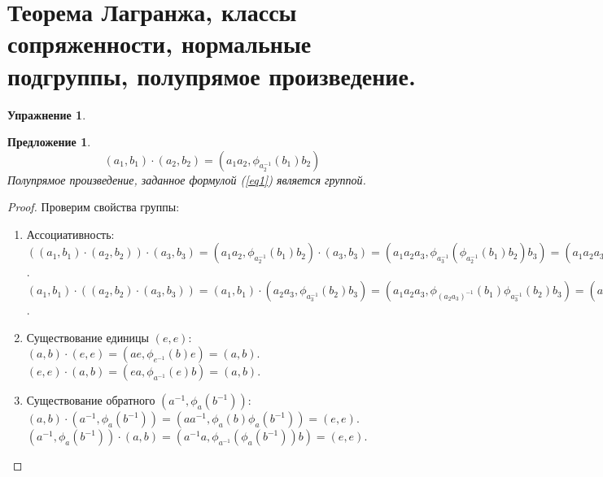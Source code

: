 \documentclass[12pt]{article}
\newtheorem{predl}[theorem]{Предложение}
\theoremstyle{definition}
\newtheorem{upr}[zad]{Упражнение}
\begin{document}
\section{Теорема Лагранжа, классы сопряженности, нормальные подгруппы, полупрямое произведение.}
\begin{upr}
\begin{predl}
\begin{equation}\label{eq1}
    (a_1,b_1)\cdot(a_2,b_2)=(a_1a_2,\phi_{a_2^{-1}}(b_1)b_2)
\end{equation}
Полупрямое произведение, заданное формулой (\ref{eq1}) является группой.
\end{predl}
\begin{proof}
Проверим свойства группы:
\begin{enumerate}
    \item Ассоциативность:\\
    $((a_1,b_1)\cdot(a_2,b_2))\cdot(a_3,b_3)=(a_1a_2,\phi_{a_2^{-1}}(b_1)b_2)\cdot(a_3,b_3)=(a_1a_2a_3,\phi_{a_3^{-1}}(\phi_{a_2^{-1}}(b_1)b_2)b_3)=(a_1a_2a_3,\phi_{a_3^{-1}}(\phi_{a_2^{-1}}(b_1))\phi_{a_3^{-1}}(b_2)b_3)=(a_1a_2a_3,\phi_{a_3^{-1}a_2^{-1}}(b_1)\phi_{a_3^{-1}}(b_2)b_3)$.\\
    $(a_1,b_1)\cdot((a_2,b_2)\cdot(a_3,b_3))=(a_1,b_1)\cdot(a_2a_3,\phi_{a_3^{-1}}(b_2)b_3)=(a_1a_2a_3,\phi_{(a_2a_3)^{-1}}(b_1)\phi_{a_3^{-1}}(b_2)b_3)=(a_1a_2a_3,\phi_{a_3^{-1}a_2^{-1}}(b_1)\phi_{a_3^{-1}}(b_2)b_3)$.
    \item Существование единицы $(e,e)$:\\
    $(a,b)\cdot(e,e)=(ae,\phi_{e^{-1}}(b)e)=(a,b)$.\\
    $(e,e)\cdot(a,b)=(ea,\phi_{a^{-1}}(e)b)=(a,b)$.
    \item Существование обратного $(a^{-1},\phi_a(b^{-1}))$:\\
    $(a,b)\cdot(a^{-1},\phi_a(b^{-1}))=(aa^{-1},\phi_a(b)\phi_a(b^{-1}))=(e,e)$.\\
    $(a^{-1},\phi_a(b^{-1}))\cdot(a,b)=(a^{-1}a,\phi_{a^{-1}}(\phi_a(b^{-1}))b)=(e,e)$.
\end{enumerate}
\end{proof}
\end{upr}
\end{document}
